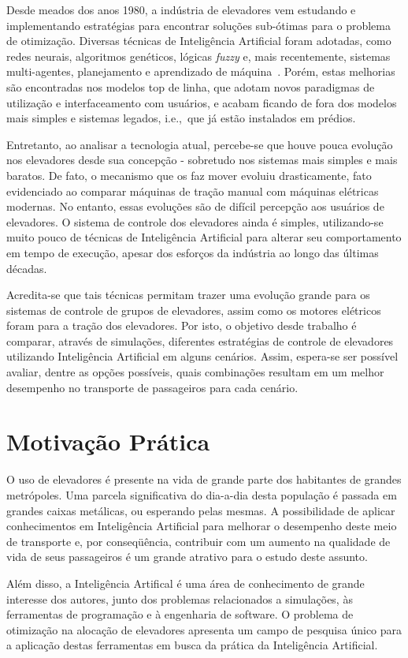 Desde meados dos anos 1980, a indústria de elevadores vem estudando e implementando estratégias para encontrar soluções sub-ótimas para o problema de otimização. Diversas técnicas de Inteligência Artificial foram adotadas, como redes neurais, algoritmos genéticos, lógicas \textit{fuzzy} e, mais recentemente, sistemas multi-agentes, planejamento e aprendizado de máquina~\cite{KOEHLEROTTIGER02}. Porém, estas melhorias são encontradas nos modelos top de linha, que adotam novos paradigmas de utilização e interfaceamento com usuários, e acabam ficando de fora dos modelos mais simples e sistemas legados, i.e.,~que já estão instalados em prédios.

Entretanto, ao analisar a tecnologia atual, percebe-se que houve pouca evolução nos elevadores desde sua concepção - sobretudo nos sistemas mais simples e mais baratos. De fato, o mecanismo que os faz mover evoluiu drasticamente, fato evidenciado ao comparar máquinas de tração manual com máquinas elétricas modernas. No entanto, essas evoluções são de difícil percepção aos usuários de elevadores. O sistema de controle dos elevadores ainda é simples, utilizando-se muito pouco de técnicas de Inteligência Artificial para alterar seu comportamento em tempo de execução, apesar dos esforços da indústria ao longo das últimas décadas.

Acredita-se que tais técnicas permitam trazer uma evolução grande para os sistemas de controle de grupos de elevadores, assim como os motores elétricos foram para a tração dos elevadores. Por isto, o objetivo desde trabalho é comparar, através de simulações, diferentes estratégias de controle de elevadores utilizando Inteligência Artificial em alguns cenários. Assim, espera-se ser possível avaliar, dentre as opções possíveis, quais combinações resultam em um melhor desempenho no transporte de passageiros para cada cenário.

\section{Motivação Prática}

O uso de elevadores é presente na vida de grande parte dos habitantes de grandes metrópoles. Uma parcela significativa do dia-a-dia desta população é passada em grandes caixas metálicas, ou esperando pelas mesmas. A possibilidade de aplicar conhecimentos em Inteligência Artificial para melhorar o desempenho deste meio de transporte e, por conseqüência, contribuir com um aumento na qualidade de vida de seus passageiros é um grande atrativo para o estudo deste assunto.

Além disso, a Inteligência Artifical é uma área de conhecimento de grande interesse dos autores, junto dos problemas relacionados a simulações, às ferramentas de programação e à engenharia de software. O problema de otimização na alocação de elevadores apresenta um campo de pesquisa único para a aplicação destas ferramentas em busca da prática da Inteligência Artificial.